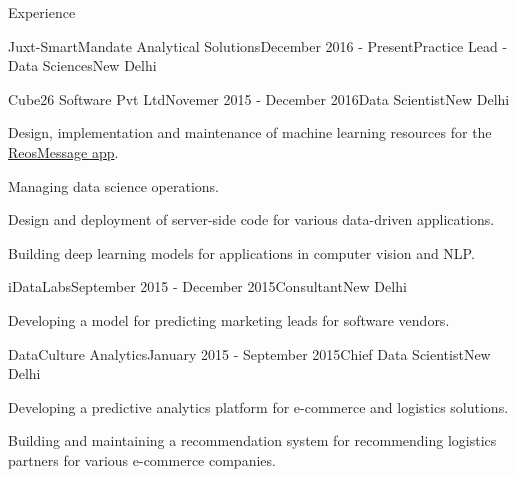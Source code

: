 \documentclass{resume} %
\begin{document}

%
%


\begin{rSection}{Experience}

\begin{rSubsection}{Juxt-SmartMandate Analytical Solutions}{December 2016 -
    Present}{Practice Lead - Data Sciences}{New Delhi}
\end{rSubsection}

\begin{rSubsection}{Cube26 Software Pvt Ltd}{Novemer 2015 - December 2016}{Data
    Scientist}{New Delhi}
\item Design, implementation and maintenance of machine learning resources for
    the \href{http://bit.ly/2bB0uGK}{ReosMessage app}.
\item Managing data science operations.
\item Design and deployment of server-side code for various data-driven
    applications.
\item Building deep learning models for applications in computer vision and
    NLP.
\end{rSubsection}

\begin{rSubsection}{iDataLabs}{September 2015 - December 2015}{Consultant}{New
    Delhi}
\item Developing a model for predicting marketing leads for software vendors.
\end{rSubsection}

\begin{rSubsection}{DataCulture Analytics}{January 2015 - September 2015}{Chief
    Data Scientist}{New Delhi}
\item Developing a predictive analytics platform for e-commerce and logistics
    solutions.
\item Building and maintaining a recommendation system for recommending
    logistics partners for various e-commerce companies.
\end{rSubsection}


\end{rSection}
\end{document}
